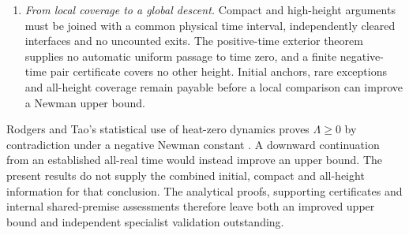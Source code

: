 \begin{enumerate}
\item \emph{From local coverage to a global descent.}
Compact and high-height arguments must be joined with a common physical
time interval, independently cleared interfaces and no uncounted exits.
The positive-time exterior theorem supplies no automatic uniform passage
to time zero, and a finite negative-time pair certificate covers no other
height. Initial anchors, rare exceptions and all-height coverage remain
payable before a local comparison can improve a Newman upper bound.
\end{enumerate}

Rodgers and Tao's statistical use of heat-zero dynamics proves
$\Lambda\ge0$ by contradiction under a negative Newman constant
\cite{RodgersTao2020Newman}. A downward continuation from an established
all-real time would instead improve an upper bound. The present results
do not supply the combined initial, compact and all-height information
for that conclusion. The analytical proofs, supporting certificates and
internal shared-premise assessments therefore leave both an improved
upper bound and independent specialist validation outstanding.
